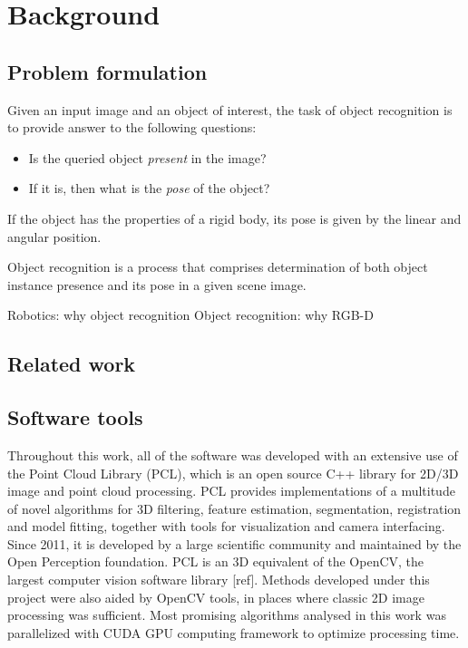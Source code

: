 \chapter{Background}
\label{cha:background}




\section{Problem formulation}
\label{sec:problem}

Given an input image and an object of interest, the task of object recognition is to provide answer to the following questions:
\begin{itemize}
\item Is the queried object \textit{present} in the image?
\item If it is, then what is the \textit{pose} of the object?
\end{itemize}
If the object has the properties of a rigid body, its pose is given by the linear and angular position.


Object recognition is a process that comprises determination of both object instance presence and its pose in a given scene image.   

Robotics: why object recognition
Object recognition: why RGB-D




\section{Related work}
\label{sec:related}



\section{Software tools}
\label{sec:software}

Throughout this work, all of the software was developed with an extensive use of the Point Cloud Library (PCL)\cite{Rusu_ICRA2011_PCL}, which is an open source C++ library for 2D/3D image and point cloud processing. PCL provides implementations of  a multitude of novel algorithms for 3D filtering, feature estimation, segmentation, registration and model fitting, together with tools for visualization and camera interfacing. Since 2011, it is developed by a large scientific community and maintained by the Open Perception foundation. PCL is an 3D equivalent of the OpenCV, the largest computer vision software library [ref]. Methods developed under this project were also aided by OpenCV tools, in places where classic 2D image processing was sufficient.
Most promising algorithms analysed in this work was parallelized with CUDA GPU  computing framework to optimize processing time.





